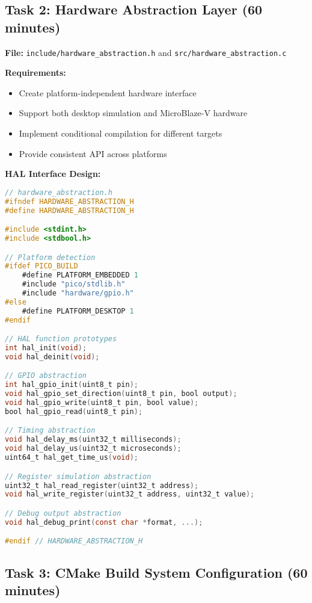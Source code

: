 \documentclass[11pt,a4paper]{article}
\begin{document}
\subsection{Task 2: Hardware Abstraction Layer (60 minutes)}

\textbf{File:} \texttt{include/hardware\_abstraction.h} and \texttt{src/hardware\_abstraction.c}

\textbf{Requirements:}
\begin{itemize}
    \item Create platform-independent hardware interface
    \item Support both desktop simulation and MicroBlaze-V hardware
    \item Implement conditional compilation for different targets
    \item Provide consistent API across platforms
\end{itemize}

\textbf{HAL Interface Design:}
\begin{lstlisting}[language=C]
// hardware_abstraction.h
#ifndef HARDWARE_ABSTRACTION_H
#define HARDWARE_ABSTRACTION_H

#include <stdint.h>
#include <stdbool.h>

// Platform detection
#ifdef PICO_BUILD
    #define PLATFORM_EMBEDDED 1
    #include "pico/stdlib.h"
    #include "hardware/gpio.h"
#else
    #define PLATFORM_DESKTOP 1
#endif

// HAL function prototypes
int hal_init(void);
void hal_deinit(void);

// GPIO abstraction
int hal_gpio_init(uint8_t pin);
void hal_gpio_set_direction(uint8_t pin, bool output);
void hal_gpio_write(uint8_t pin, bool value);
bool hal_gpio_read(uint8_t pin);

// Timing abstraction
void hal_delay_ms(uint32_t milliseconds);
void hal_delay_us(uint32_t microseconds);
uint64_t hal_get_time_us(void);

// Register simulation abstraction
uint32_t hal_read_register(uint32_t address);
void hal_write_register(uint32_t address, uint32_t value);

// Debug output abstraction
void hal_debug_print(const char *format, ...);

#endif // HARDWARE_ABSTRACTION_H
\end{lstlisting}

\subsection{Task 3: CMake Build System Configuration (60 minutes)}
\end{document}
